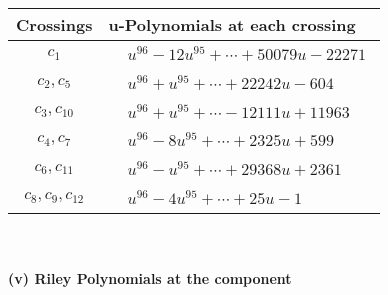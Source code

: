\documentclass[1p]{elsarticle_modified}
\theoremstyle{definition}
\begin{document}
\begin{tabular}{m{50pt}|m{274pt}}
Crossings & \hspace{64pt}u-Polynomials at each crossing \\
\hline $$\begin{aligned}c_{1}\end{aligned}$$&$\begin{aligned}
&u^{96}-12 u^{95}+\cdots+50079 u-22271
\end{aligned}$\\
\hline $$\begin{aligned}c_{2},c_{5}\end{aligned}$$&$\begin{aligned}
&u^{96}+u^{95}+\cdots+22242 u-604
\end{aligned}$\\
\hline $$\begin{aligned}c_{3},c_{10}\end{aligned}$$&$\begin{aligned}
&u^{96}+u^{95}+\cdots-12111 u+11963
\end{aligned}$\\
\hline $$\begin{aligned}c_{4},c_{7}\end{aligned}$$&$\begin{aligned}
&u^{96}-8 u^{95}+\cdots+2325 u+599
\end{aligned}$\\
\hline $$\begin{aligned}c_{6},c_{11}\end{aligned}$$&$\begin{aligned}
&u^{96}- u^{95}+\cdots+29368 u+2361
\end{aligned}$\\
\hline $$\begin{aligned}c_{8},c_{9},c_{12}\end{aligned}$$&$\begin{aligned}
&u^{96}-4 u^{95}+\cdots+25 u-1
\end{aligned}$\\
\hline
\end{tabular}\\~\\
\newpage\renewcommand{\arraystretch}{1}
\flushleft \textbf{(v) Riley Polynomials at the component}\newline \\
\end{document}

